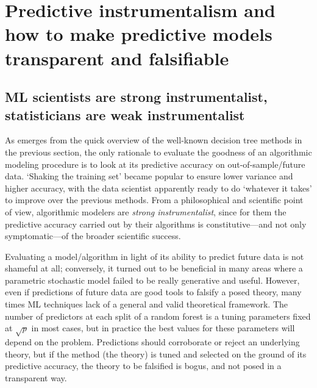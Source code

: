 \documentclass{statsoc}
\begin{document}
\color{blue}

%
%
%
%
%

\color{black}

\section{Predictive instrumentalism and  how to make predictive models transparent and falsifiable}
\label{sec:instr}

\subsection{ML scientists are strong instrumentalist, statisticians are weak instrumentalist}

As emerges from the quick overview of the well-known decision tree methods in the previous section, the only rationale to evaluate the goodness of an algorithmic modeling procedure is to look at its 
predictive accuracy on out-of-sample/future data. `Shaking the training set' became popular to ensure lower variance and higher accuracy, with the data scientist apparently ready to 
do `whatever it takes' to improve over the previous methods. From a philosophical and scientific point of view, algorithmic modelers are \emph{strong instrumentalist}, since for 
them the predictive accuracy carried out by their algorithms is constitutive---and not only symptomatic---of the broader scientific success.

Evaluating a model/algorithm in light of its ability to predict future data is not shameful at all; conversely, it turned out to be beneficial in many areas where a parametric 
stochastic model failed to be really generative and useful. However, even if predictions of future data are good tools to falsify a posed theory, many times ML 
techniques lack of a general and valid theoretical framework. The number of predictors at each split of a random forest is a tuning parameters fixed at $\sqrt{p}$ in most cases, but 
in practice the best values for these parameters will depend on the problem. Predictions should corroborate or reject an underlying theory, but if the method (the theory) is tuned 
and selected on the ground of its predictive accuracy, the theory to be falsified is bogus, and not posed in a transparent way.
\end{document}
